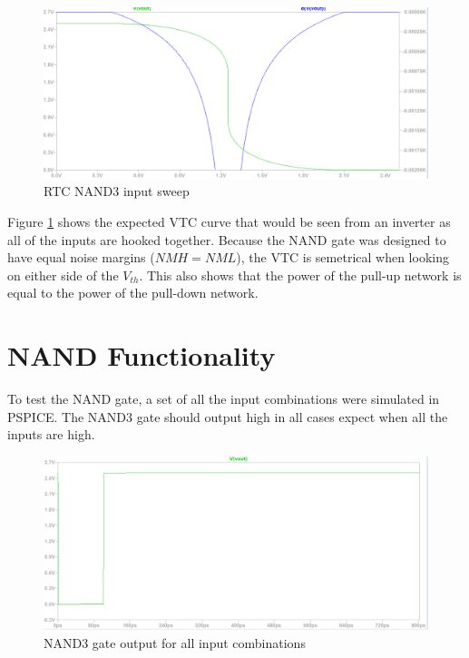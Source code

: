 \documentclass[CMPE]{../KGCOEReport}
\begin{document}
     \begin{figure}[h!]
     	\centering
       \includegraphics[width=5.5in]{img/nand_sweep.png}
       \caption{RTC NAND3 input sweep}
       \label{fig:nand_sweep}
	 \end{figure}

	Figure \ref{fig:nand_sweep} shows the expected VTC curve that
	would be seen from an inverter as all of the inputs are hooked
	together. Because the NAND gate was designed to have equal noise
	margins ($NMH = NML$), the VTC is semetrical when looking on
	either side of the $V_{th}$. This also shows that the power of the
	pull-up network is equal to the power of the pull-down network.\\

	\section*{NAND Functionality}
	
	To test the NAND gate, a set of all the input combinations were simulated
	in PSPICE. The NAND3 gate should output high in all cases expect when all
	the inputs are high.

	\begin{figure}[h!]
     	\centering
       \includegraphics[width=5.5in]{img/nand_pulse.png}
       \caption{NAND3 gate output for all input combinations}
       \label{fig:nand_pulse}
	 \end{figure}
\end{document}
